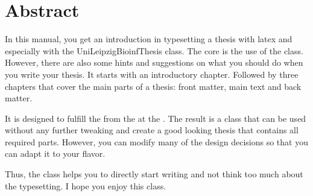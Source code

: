 
\chapter*{Abstract}

In this manual, you get an introduction in typesetting a thesis with latex and
especially with the UniLeipzigBioinfThesis class.  The core is the use of the
class. However, there are also some hints and suggestions on what you should
do when you write your thesis. It starts with an introductory chapter.
Followed by three chapters that cover the main parts of a thesis: front
matter, main text and back matter.

It is designed to fulfill the  from the  at the . The result is a class that
can be used without any further tweaking and create a good looking thesis that
contains all required parts. However, you can modify many of the design
decisions so that you can adapt it to your flavor.

Thus, the class helps you to directly start writing and not think too much
about the typesetting. I hope you enjoy this class.


%

